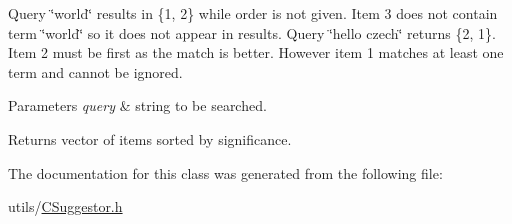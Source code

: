 Query \char`\"{}world\char`\"{} results in \{1, 2\} while order is not given. Item 3 does not contain term \char`\"{}world\char`\"{} so it does not appear in results. Query \char`\"{}hello czech\char`\"{} returns \{2, 1\}. Item 2 must be first as the match is better. However item 1 matches at least one term and cannot be ignored.


\begin{DoxyParams}{Parameters}
{\em query} & string to be searched. \\
\hline
\end{DoxyParams}
\begin{DoxyReturn}{Returns}
vector of items sorted by significance. 
\end{DoxyReturn}


The documentation for this class was generated from the following file\+:\begin{DoxyCompactItemize}
\item 
utils/\mbox{\hyperlink{_c_suggestor_8h}{C\+Suggestor.\+h}}\end{DoxyCompactItemize}
